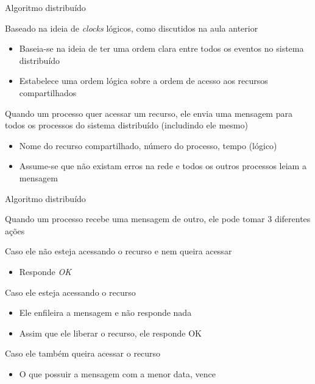 \documentclass[compress]{beamer}
\begin{document}
\begin{frame}{Algoritmo distribuído}

Baseado na ideia de \textit{clocks} lógicos, como discutidos na aula anterior
\begin{itemize}
    \item Baseia-se na ideia de ter uma ordem clara entre todos os eventos no sistema distribuído
    \item Estabelece uma ordem lógica sobre a ordem de acesso aos recursos compartilhados
\end{itemize}

\vspace{0.5cm}

Quando um processo quer acessar um recurso, ele envia uma mensagem para todos os processos do sistema distribuído (includindo ele mesmo)
\begin{itemize}
    \item Nome do recurso compartilhado, número do processo, tempo (lógico)
    \item Assume-se que não existam erros na rede e todos os outros processos leiam a mensagem
\end{itemize}
\end{frame}


\begin{frame}{Algoritmo distribuído}

Quando um processo recebe uma mensagem de outro, ele pode tomar 3 diferentes ações

\vspace{0.3cm}

Caso ele não esteja acessando o recurso e nem queira acessar
\begin{itemize}
    \item Responde \textit{OK}
\end{itemize}

\vspace{0.3cm}

Caso ele esteja acessando o recurso
\begin{itemize}
    \item Ele enfileira a mensagem e não responde nada
    \item Assim que ele liberar o recurso, ele responde OK
\end{itemize}

\vspace{0.3cm}

Caso ele também queira acessar o recurso
\begin{itemize}
    \item O que possuir a mensagem com a menor data, vence
\end{itemize}

\end{frame}
\end{document}
